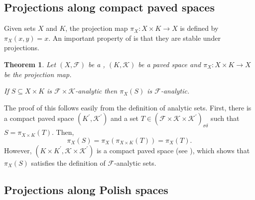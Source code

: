 \documentclass[12pt]{article}
\newtheorem{theorem}{Theorem}
\begin{document}

\subsection*{Projections along compact paved spaces}

Given sets $X$ and $K$, the projection map $\pi_X\colon X\times K\rightarrow X$ is defined by $\pi_X(x,y)=x$. An important property of  is that they are stable under projections.

\begin{theorem}\label{thm:1}
Let $(X,\mathcal{F})$ be a , $(K,\mathcal{K})$ be a  paved space and $\pi_X\colon X\times K\rightarrow X$ be the projection map.

If $S\subseteq X\times K$ is $\mathcal{F}\times\mathcal{K}$-analytic then $\pi_X(S)$ is $\mathcal{F}$-analytic.
\end{theorem}

The proof of this follows easily from the definition of analytic sets.
First, there is a compact paved space $(K^\prime,\mathcal{K}^\prime)$ and a set $T\in\left(\mathcal{F}\times\mathcal{K}\times\mathcal{K}^\prime\right)_{\sigma\delta}$ such that $S=\pi_{X\times K}(T)$. Then,
\begin{equation*}
\pi_X(S)=\pi_X\left(\pi_{X\times K}(T)\right)=\pi_X(T).
\end{equation*}
However, $(K\times K^\prime,\mathcal{K}\times\mathcal{K}^\prime)$ is a compact paved space (see ), which shows that $\pi_X(S)$ satisfies the definition of $\mathcal{F}$-analytic sets.

\subsection*{Projections along Polish spaces}
\end{document}
